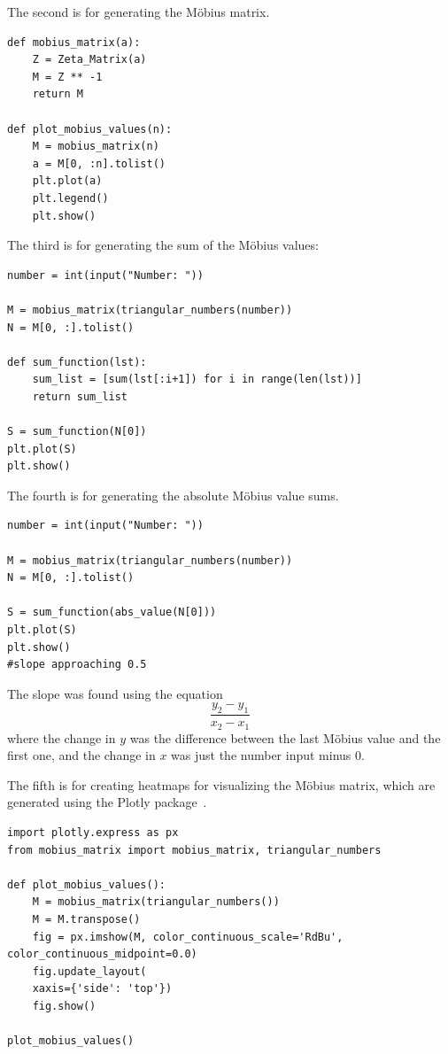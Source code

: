\documentclass{amsart}
\theoremstyle{definition}
\newcommand{\Mobius}{M\"obius}
\newenvironment{graybox}
    {\begin{mdframed}[
    backgroundcolor=light-gray, 
    linecolor=light-gray,
    leftmargin=1, 
    rightmargin=1, 
    innerleftmargin=15, 
    innertopmargin=5,
    innerbottommargin=5, 
    outerlinewidth=1, 
    ]}
    {\end{mdframed}}
\begin{document}
\bigskip
The second is for generating the \Mobius{} matrix.
\begin{graybox}
\begin{lstlisting}
def mobius_matrix(a):
    Z = Zeta_Matrix(a)
    M = Z ** -1
    return M

def plot_mobius_values(n):
    M = mobius_matrix(n)
    a = M[0, :n].tolist() 
    plt.plot(a)
    plt.legend()
    plt.show()
\end{lstlisting}
\end{graybox}
    


\bigskip
The third is for generating the sum of the \Mobius{} values:
\begin{graybox}
\begin{lstlisting}
number = int(input("Number: "))

M = mobius_matrix(triangular_numbers(number))
N = M[0, :].tolist()

def sum_function(lst):
    sum_list = [sum(lst[:i+1]) for i in range(len(lst))]
    return sum_list

S = sum_function(N[0])
plt.plot(S)
plt.show()
\end{lstlisting}
\end{graybox}

\bigskip
The fourth is for generating the absolute \Mobius{} value sums.
\begin{graybox}
\begin{lstlisting}
number = int(input("Number: "))

M = mobius_matrix(triangular_numbers(number))
N = M[0, :].tolist()

S = sum_function(abs_value(N[0]))
plt.plot(S)
plt.show()
#slope approaching 0.5
\end{lstlisting}
\end{graybox}

\bigskip
The slope was found using the equation
\begin{equation}
    \frac{y_2 - y_1}{x_2 - x_1}
\end{equation}
where the change in $y$ was the difference between the last M\"{o}bius value and the first one, and the change in $x$ was just the number input minus $0$.

The fifth is for creating heatmaps for visualizing the \Mobius{} matrix, which are generated using the Plotly package~\cite{plotly}.

\begin{graybox}
\begin{lstlisting}
import plotly.express as px
from mobius_matrix import mobius_matrix, triangular_numbers

def plot_mobius_values():
    M = mobius_matrix(triangular_numbers())
    M = M.transpose()
    fig = px.imshow(M, color_continuous_scale='RdBu', color_continuous_midpoint=0.0)
    fig.update_layout(
    xaxis={'side': 'top'})
    fig.show()

plot_mobius_values()
\end{lstlisting}
\end{graybox}
\end{document}
